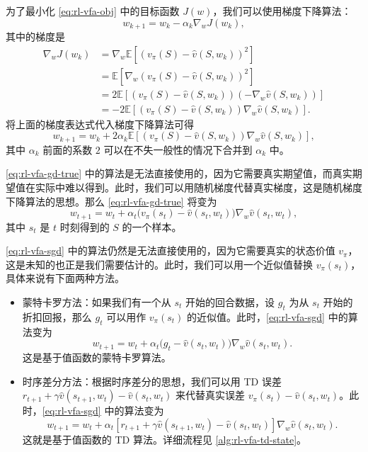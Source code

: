 为了最小化 \cref{eq:rl-vfa-obj} 中的目标函数 $J(w)$，我们可以使用梯度下降算法：
\begin{equation*}
w_{k+1} = w_{k} - \alpha_{k} \nabla_{w} J(w_{k}),
\end{equation*}
其中的梯度是
\begin{equation*}
\begin{aligned}
\nabla_{w} J(w_{k}) &= \nabla_{w} \mathbb{E}[(v_{\pi}(S) - \hat{v}(S, w_{k}))^{2}] \\
&= \mathbb{E}[\nabla_{w}(v_{\pi}(S) - \hat{v}(S, w_{k}))^{2}] \\
&= 2 \mathbb{E}[(v_{\pi}(S) - \hat{v}(S, w_{k}))(-\nabla_{w} \hat{v}(S, w_{k}))] \\
&= -2 \mathbb{E}[(v_{\pi}(S) - \hat{v}(S, w_{k})) \nabla_{w} \hat{v}(S, w_{k})].
\end{aligned}
\end{equation*}
将上面的梯度表达式代入梯度下降算法可得
\begin{equation}
w_{k+1} = w_{k} + 2 \alpha_{k} \mathbb{E}[(v_{\pi}(S) - \hat{v}(S, w_{k})) \nabla_{w} \hat{v}(S, w_{k})],
\label{eq:rl-vfa-gd-true}
\end{equation}
其中 $\alpha_{k}$ 前面的系数 $2$ 可以在不失一般性的情况下合并到 $\alpha_{k}$ 中。

\cref{eq:rl-vfa-gd-true} 中的算法是无法直接使用的，因为它需要真实期望值，而真实期望值在实际中难以得到。此时，我们可以用随机梯度代替真实梯度，这是随机梯度下降算法的思想。那么 \cref{eq:rl-vfa-gd-true} 将变为
\begin{equation}
w_{t+1} = w_{t} + \alpha_{t} \big(v_{\pi}(s_{t}) - \hat{v}(s_{t}, w_{t})\big) \nabla_{w} \hat{v}(s_{t}, w_{t}),
\label{eq:rl-vfa-sgd}
\end{equation}
其中 $s_t$ 是 $t$ 时刻得到的 $S$ 的一个样本。

\cref{eq:rl-vfa-sgd} 中的算法仍然是无法直接使用的，因为它需要真实的状态价值 $v_{\pi}$，这是未知的也正是我们需要估计的。此时，我们可以用一个近似值替换 $v_{\pi}(s_t)$，具体来说有下面两种方法。

\begin{itemize}
  \item 蒙特卡罗方法：如果我们有一个从 $s_{t}$ 开始的回合数据，设 $g_{t}$ 为从 $s_{t}$ 开始的折扣回报，那么 $g_{t}$ 可以用作 $v_{\pi}(s_{t})$ 的近似值。此时，\cref{eq:rl-vfa-sgd} 中的算法变为
  \begin{equation*}
  w_{t+1} = w_{t} + \alpha_{t} \big(g_{t} - \hat{v}(s_{t}, w_{t})\big) \nabla_{w} \hat{v}(s_{t}, w_{t}).
  \end{equation*}
  这是基于值函数的蒙特卡罗算法。
  \item 时序差分方法：根据时序差分的思想，我们可以用 TD 误差 $r_{t+1} + \gamma \hat{v}(s_{t+1}, w_t) - \hat{v}(s_t, w_t)$ 来代替真实误差 $v_\pi(s_t) - \hat{v}(s_t, w_t)$。此时，\cref{eq:rl-vfa-sgd} 中的算法变为
  \begin{equation}
  w_{t+1} = w_{t} + \alpha_{t} \left[r_{t+1} + \gamma \hat{v}(s_{t+1}, w_{t}) - \hat{v}(s_{t}, w_{t})\right] \nabla_{w} \hat{v}(s_{t}, w_{t}).
  \label{eq:rl-vfa-td}
  \end{equation}
  这就是基于值函数的 TD 算法。详细流程见 \cref{alg:rl-vfa-td-state}。
\end{itemize}

